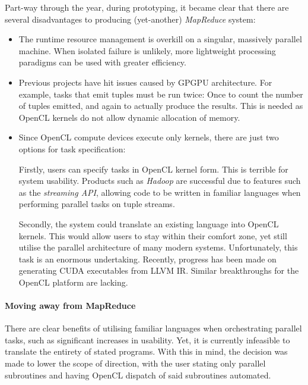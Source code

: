 Part-way through the year, during prototyping, it became clear that there are several disadvantages to producing (yet-another) \emph{MapReduce} system:
\begin{itemize}
\item The runtime resource management is overkill on a singular, massively parallel machine. When isolated failure is unlikely, more lightweight processing paradigms can be used with greater efficiency.

\item Previous projects have hit issues caused by \ac{GPGPU} architecture. For example, tasks that emit tuples must be run twice: Once to count the number of tuples emitted, and again to actually produce the results. This is needed as \ac{OpenCL} kernels do not allow dynamic allocation of memory.

\item Since \ac{OpenCL} compute devices execute only kernels, there are just two options for task specification:

Firstly, users can specify tasks in \ac{OpenCL} kernel form. This is terrible for system usability. Products such as \emph{Hadoop} are successful due to features such as the \emph{streaming \ac{API}}, allowing code to be written in familiar languages when performing parallel tasks on tuple streams.

Secondly, the system could translate an existing language into \ac{OpenCL} kernels. This would allow users to stay within their comfort zone, yet still utilise the parallel architecture of many modern systems. Unfortunately, this task is an enormous undertaking. Recently, progress has been made on generating \ac{CUDA} executables from LLVM \ac{IR}. Similar breakthroughs for the \ac{OpenCL} platform are lacking.
\end{itemize}

\paragraph*{Moving away from MapReduce}
There are clear benefits of utilising familiar languages when orchestrating parallel tasks, such as significant increases in usability.
Yet, it is currently infeasible to translate the entirety of stated programs.
With this in mind, the decision was made to lower the scope of direction, with the user stating only parallel subroutines and having \ac{OpenCL} dispatch of said subroutines automated.

